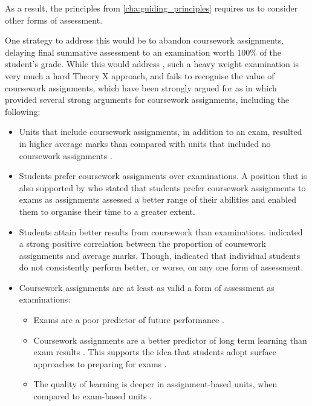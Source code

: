 As a result, the principles from \cref{cha:guiding_principles} requires us to consider other forms of assessment.
  
%
%

One strategy to address this would be to abandon coursework assignments, delaying final summative assessment to an examination worth 100\% of the student's grade. While this would address , such a heavy weight examination is very much a hard Theory X approach, and fails to recognise the value of coursework assignments, which have been strongly argued for as in \citet{Gibbs:2004} which provided several strong arguments for coursework assignments, including the following:
\begin{itemize}[noitemsep,nolistsep]
	\item Units that include coursework assignments, in addition to an exam, resulted in higher average marks than compared with units that included no coursework assignments \cite{Chansarkar:1987}.
	\item Students prefer coursework assignments over examinations. A position that is also supported by \citet{Kniveton:1996} who stated that students prefer coursework assignments to exams as assignments assessed a better range of their abilities and enabled them to organise their time to a greater extent.
	\item Students attain better results from coursework than examinations. \citet{Gibbs:1997} indicated a strong positive correlation between the proportion of coursework assignments and average marks. Though, \citet{James:2004} indicated that individual students do not consistently perform better, or worse, on any one form of assessment.
	\item Coursework assignments are at least as valid a form of assessment as examinations:
	\begin{itemize}[noitemsep,nolistsep]
		\item Exams are a poor predictor of future performance \cite{Baird:1985,Gibbs:2004}.
		\item Coursework assignments are a better predictor of long term learning than exam results \cite{Conway:1992}. This supports the idea that students adopt surface approaches to preparing for exams \citet{Marton:1976a, Tang:1999}. 
		\item The quality of learning is deeper in assignment-based units, when compared to exam-based units \cite{Tynjala:1998,Gibbs:2004}.
	\end{itemize}
\end{itemize}

